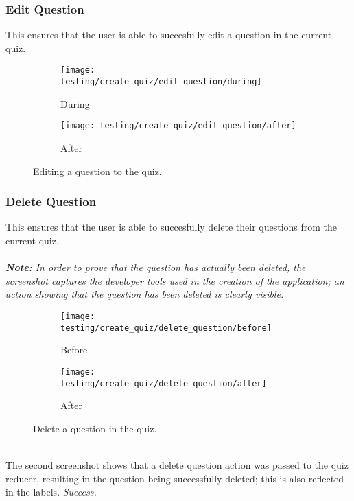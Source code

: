 \subsubsection{Edit Question} %
\label{ssub:edit_question}
This ensures that the user is able to succesfully edit a question in the current quiz.
\begin{figure}[!htbp]
\begin{subfigure}{0.5\textwidth}
  \centering
  \texttt{[image: testing/create\_quiz/edit\_question/during]}
  \caption{During}
  \label{fig:sub2}
\end{subfigure}
\begin{subfigure}{0.5\textwidth}
  \centering
  \texttt{[image: testing/create\_quiz/edit\_question/after]}
  \caption{After}
  \label{fig:sub3}
\end{subfigure}
\caption{Editing a question to the quiz.}
\label{fig:test}
\end{figure}


\subsubsection{Delete Question} %
\label{ssub:delete_question}
This ensures that the user is able to succesfully delete their questions from the current quiz.
\\\\\textit{\textbf{Note:} In order to prove that the question has actually been deleted, the screenshot captures the developer tools used in the creation of the application; an action showing that the question has been deleted is clearly visible.}
\begin{figure}[!htbp]
\centering
\begin{subfigure}{0.5\textwidth}
  \centering
  \texttt{[image: testing/create\_quiz/delete\_question/before]}
  \caption{Before}
  \label{fig:sub1}
\end{subfigure}%
\begin{subfigure}{0.5\textwidth}
  \centering
  \texttt{[image: testing/create\_quiz/delete\_question/after]}
  \caption{After}
  \label{fig:sub2}
\end{subfigure}
\caption{Delete a question in the quiz.}
\label{fig:test}
\end{figure}
\\The second screenshot shows that a delete question action was passed to the quiz reducer, resulting in the question being successfully deleted; this is also reflected in the labels. \textit{Success.}


